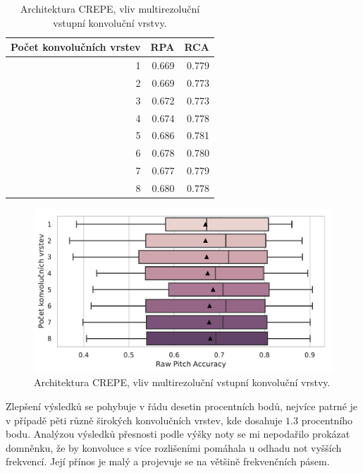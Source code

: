 \begin{table}[h!]
\centering
    \begin{tabular}{rrr}
    \toprule
    Počet konvolučních vrstev &   RPA &   RCA \\
    \midrule
                            1 & 0.669 & 0.779 \\
                            2 & 0.669 & 0.773 \\
                            3 & 0.672 & 0.773 \\
                            4 & 0.674 & 0.778 \\
                            5 & 0.686 & 0.781 \\
                            6 & 0.678 & 0.780 \\
                            7 & 0.677 & 0.779 \\
                            8 & 0.680 & 0.778 \\
    \bottomrule
    \end{tabular}
\caption{Architektura CREPE, vliv multirezoluční vstupní konvoluční vrstvy.}\label{tab:crepe_multirozliseni}
\end{table}

\begin{figure}[h!]\centering
    \includegraphics[scale=0.6]{../img/figures/crepe_multirozliseni.pdf}
\caption{Architektura CREPE, vliv multirezoluční vstupní konvoluční vrstvy.}\label{obr:crepe_multirozliseni}
\end{figure}

Zlepšení výsledků se pohybuje v řádu desetin procentních bodů, nejvíce patrné je v případě pěti různě širokých konvolučních vrstev, kde dosahuje $1.3$ procentního bodu. Analýzou výsledků přesnosti podle výšky noty se mi nepodařilo prokázat domněnku, že by konvoluce s více rozlišeními pomáhala u odhadu not vyšších frekvencí. Její přínos je malý a projevuje se na většině frekvenčních pásem.

